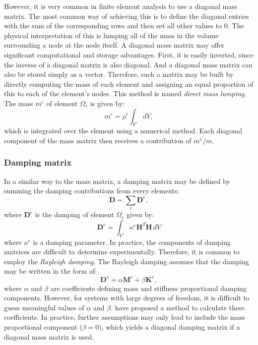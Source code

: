 However, it is very common in finite element analysis to use a diagonal mass matrix. The most common way of achieving this is to define the diagonal entries with the sum of the corresponding rows and then set all other values to 0. The physical interpretation of this is lumping all of the mass in the volume surrounding a node at the node itself. A diagonal mass matrix may offer significant computational and storage advantages. First, it is easily inverted, since the inverse of a diagonal matrix is also diagonal. And a diagonal mass matrix can also be stored simply as a vector. Therefore, such a matrix may be built by directly computing the mass of each element and assigning an equal proportion of this to each of the element's nodes. This method is named \emph{direct mass lumping}. The mass $ m^e $ of element $ \Omega_e $ is given by:
\begin{equation}
m^e = \rho^e \int_{V^e} dV,
\end{equation}
which is integrated over the element using a numerical method. Each diagonal component of the mass matrix then receives a contribution of $ m^e/m $. 
		
		\subsubsection*{Damping matrix}
In a similar way to the mass matrix, a damping matrix may be defined by summing the damping contributions from every elements:
\begin{equation}
\mathbf{D} = \sum_e \mathbf{D}^e,
\end{equation}
where $ \mathbf{D}^e $ is the damping of element $ \Omega_e $ given by:
\begin{equation}
\mathbf{D}^e = \int_{V^e} \kappa^e \mathbf{H}^T \mathbf{H} \, dV
\end{equation}
where $ \kappa^e $ is a damping parameter. In practice, the components of damping matrices are difficult to determine experimentally. Therefore, it is common to employ the \emph{Rayleigh damping}. The Rayleigh damping assumes that the damping may be written in the form of:
\begin{equation}
\mathbf{D}^e = \alpha \mathbf{M}^e + \beta \mathbf{K}^e,
\end{equation}
where $ \alpha $ and $ \beta $ are coefficients defining mass and stiffness proportional damping components. However, for systems with large degrees of freedom, it is difficult to guess meaningful values of $ \alpha $ and $ \beta $. \cite{Chowdhury03} have proposed a method to calculate these coefficients. In practice, further assumptions may only lead to include the mass proportional component ($ \beta = 0 $), which yields a diagonal damping matrix if a diagonal mass matrix is used. 

